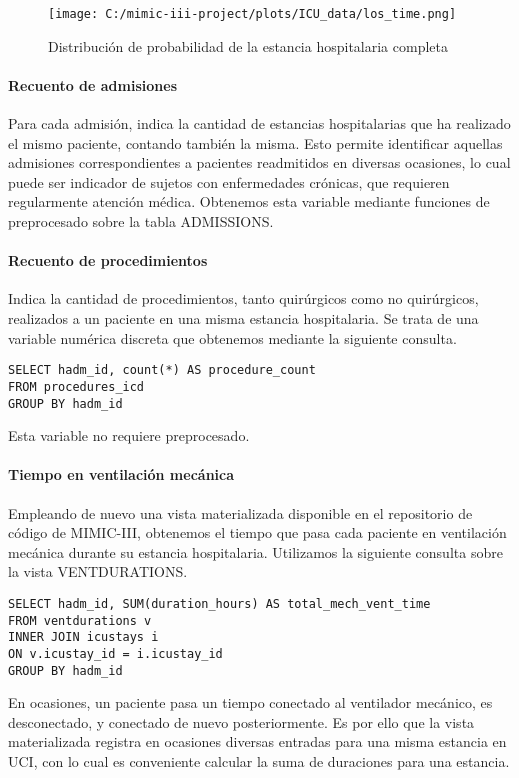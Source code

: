 \documentclass{report}
\begin{document}
\begin{figure}[H]
\centering
\texttt{[image: C:/mimic-iii-project/plots/ICU\_data/los\_time.png]}
\caption{Distribución de probabilidad de la estancia hospitalaria completa}
\end{figure}

\paragraph{Recuento de admisiones}

Para cada admisión, indica la cantidad de estancias hospitalarias que ha
realizado el mismo paciente, contando también la misma. Esto permite identificar aquellas admisiones correspondientes a
pacientes readmitidos en diversas ocasiones, lo cual puede ser indicador
de sujetos con enfermedades crónicas, que requieren regularmente
atención médica. Obtenemos esta variable mediante funciones de preprocesado sobre la
tabla ADMISSIONS.

\paragraph{Recuento de procedimientos}
Indica la cantidad de procedimientos, tanto quirúrgicos como no
quirúrgicos, realizados a un paciente en una misma estancia
hospitalaria. Se trata de una variable numérica discreta que obtenemos
mediante la siguiente consulta.

\begin{verbatim}
SELECT hadm_id, count(*) AS procedure_count
FROM procedures_icd
GROUP BY hadm_id
\end{verbatim}
Esta variable no requiere preprocesado.

\paragraph{Tiempo en ventilación mecánica}

Empleando de nuevo una vista materializada disponible en el repositorio
de código de MIMIC-III, obtenemos el tiempo que pasa cada paciente en
ventilación mecánica durante su estancia hospitalaria. Utilizamos la
siguiente consulta sobre la vista VENTDURATIONS.

\begin{verbatim}
SELECT hadm_id, SUM(duration_hours) AS total_mech_vent_time
FROM ventdurations v
INNER JOIN icustays i
ON v.icustay_id = i.icustay_id
GROUP BY hadm_id
\end{verbatim}
En ocasiones, un paciente pasa un tiempo conectado al ventilador
mecánico, es desconectado, y conectado de nuevo posteriormente. Es por
ello que la vista materializada registra en ocasiones diversas entradas
para una misma estancia en UCI, con lo cual es conveniente calcular la
suma de duraciones para una estancia.
\end{document}
